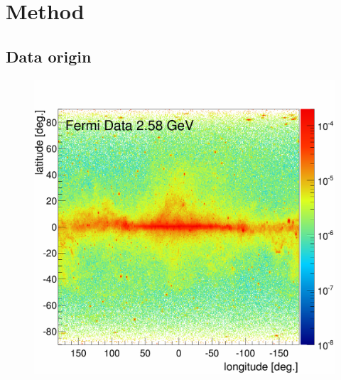 \chapter{Method}
\label{ch:method}

\section{Data origin}
\label{sec:Data_origin}


\begin{figure}[h]
  \centering
  \begin{minipage}[h]{0.45\textwidth}
  	\centering
	\includegraphics[width=1.\linewidth]{pic/method/Flux_FermiData_raw_E12.png}
  	\label{fig:SCRonly_bubble_spec}
  \end{minipage}
  \hfill
  \begin{minipage}[h]{0.45\textwidth}
	  \centering

\end{minipage}
\end{figure}

